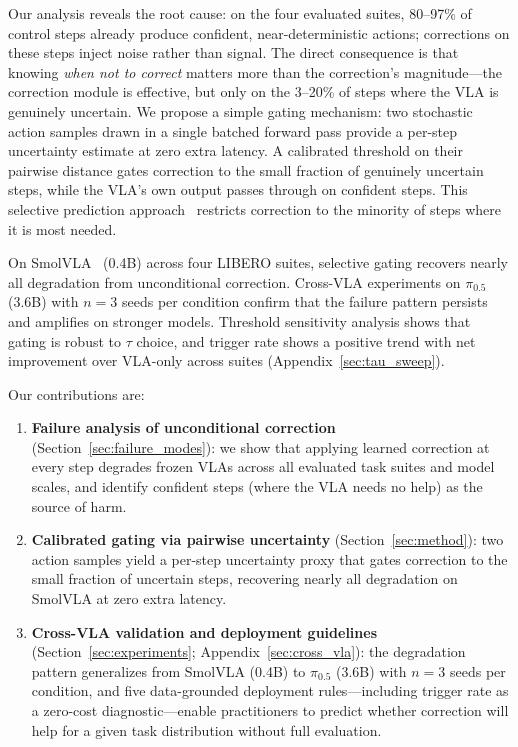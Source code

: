 Our analysis reveals the root cause: on the four evaluated suites, 80--97\% of control steps already produce confident, near-deterministic actions; corrections on these steps inject noise rather than signal. The direct consequence is that knowing \emph{when not to correct} matters more than the correction's magnitude---the correction module is effective, but only on the 3--20\% of steps where the VLA is genuinely uncertain. We propose a simple gating mechanism: two stochastic action samples drawn in a single batched forward pass provide a per-step uncertainty estimate at zero extra latency. A calibrated threshold on their pairwise distance gates correction to the small fraction of genuinely uncertain steps, while the VLA's own output passes through on confident steps. This selective prediction approach~\cite{chow1970optimum,geifman2017selective} restricts correction to the minority of steps where it is most needed.

On SmolVLA~\cite{shukor2025smolvla} (0.4B) across four LIBERO suites, selective gating recovers nearly all degradation from unconditional correction. Cross-VLA experiments on $\pi_{0.5}$~\cite{black2025pi05} (3.6B) with $n{=}3$ seeds per condition confirm that the failure pattern persists and amplifies on stronger models. Threshold sensitivity analysis shows that gating is robust to $\tau$ choice, and trigger rate shows a positive trend with net improvement over VLA-only across suites (Appendix~\ref{sec:tau_sweep}).

Our contributions are:
\begin{enumerate}[leftmargin=*,nosep]
  \item \textbf{Failure analysis of unconditional correction} (Section~\ref{sec:failure_modes}): we show that applying learned correction at every step degrades frozen VLAs across all evaluated task suites and model scales, and identify confident steps (where the VLA needs no help) as the source of harm.
  \item \textbf{Calibrated gating via pairwise uncertainty} (Section~\ref{sec:method}): two action samples yield a per-step uncertainty proxy that gates correction to the small fraction of uncertain steps, recovering nearly all degradation on SmolVLA at zero extra latency.
  \item \textbf{Cross-VLA validation and deployment guidelines} (Section~\ref{sec:experiments}; Appendix~\ref{sec:cross_vla}): the degradation pattern generalizes from SmolVLA (0.4B) to $\pi_{0.5}$ (3.6B) with $n{=}3$ seeds per condition, and five data-grounded deployment rules---including trigger rate as a zero-cost diagnostic---enable practitioners to predict whether correction will help for a given task distribution without full evaluation.
\end{enumerate}
